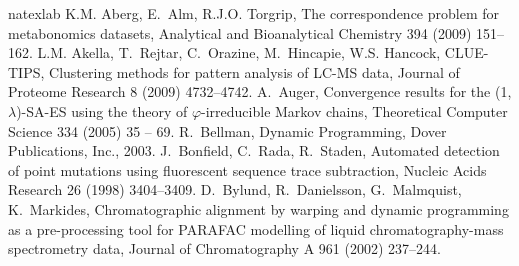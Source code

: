 \documentclass[number,1p,12pt]{elsarticle}
\begin{document}
\begin{thebibliography}{28}
\expandafter\ifx\csname natexlab\endcsname\relax\def\natexlab#1{#1}\fi
\providecommand{\bibinfo}[2]{#2}
\ifx\xfnm\relax \def\xfnm[#1]{\unskip,\space#1}\fi
\bibinfo{author}{K.M. Aberg}, \bibinfo{author}{E.~Alm}, \bibinfo{author}{R.J.O.
  Torgrip}, \bibinfo{title}{{The correspondence problem for metabonomics
  datasets}}, \bibinfo{journal}{{Analytical and Bioanalytical Chemistry}}
  \bibinfo{volume}{{394}} (\bibinfo{year}{{2009}}) \bibinfo{pages}{{151--162}}.
\bibinfo{author}{L.M. Akella}, \bibinfo{author}{T.~Rejtar},
  \bibinfo{author}{C.~Orazine}, \bibinfo{author}{M.~Hincapie},
  \bibinfo{author}{W.S. Hancock}, \bibinfo{title}{{CLUE-TIPS, Clustering
  methods for pattern analysis of LC-MS data}}, \bibinfo{journal}{{Journal of
  Proteome Research}} \bibinfo{volume}{{8}} (\bibinfo{year}{{2009}})
  \bibinfo{pages}{{4732--4742}}.
\bibinfo{author}{A.~Auger}, \bibinfo{title}{{Convergence results for the (1,
  $\lambda$)-SA-ES using the theory of $\varphi$-irreducible Markov chains}},
  \bibinfo{journal}{Theoretical Computer Science} \bibinfo{volume}{334}
  (\bibinfo{year}{2005}) \bibinfo{pages}{35 -- 69}.
\bibinfo{author}{R.~Bellman}, \bibinfo{title}{Dynamic Programming},
  \bibinfo{publisher}{Dover Publications, Inc.}, \bibinfo{year}{2003}.
\bibinfo{author}{J.~Bonfield}, \bibinfo{author}{C.~Rada},
  \bibinfo{author}{R.~Staden}, \bibinfo{title}{{Automated detection of point
  mutations using fluorescent sequence trace subtraction}},
  \bibinfo{journal}{{Nucleic Acids Research}} \bibinfo{volume}{{26}}
  (\bibinfo{year}{{1998}}) \bibinfo{pages}{{3404--3409}}.
\bibinfo{author}{D.~Bylund}, \bibinfo{author}{R.~Danielsson},
  \bibinfo{author}{G.~Malmquist}, \bibinfo{author}{K.~Markides},
  \bibinfo{title}{{Chromatographic alignment by warping and dynamic programming
  as a pre-processing tool for PARAFAC modelling of liquid chromatography-mass
  spectrometry data}}, \bibinfo{journal}{{Journal of Chromatography A}}
  \bibinfo{volume}{{961}} (\bibinfo{year}{{2002}}) \bibinfo{pages}{{237--244}}.

\end{thebibliography}
\end{document}
